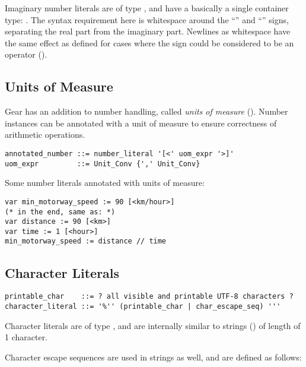 Imaginary number literals are of type , and have a basically a single container type: . The syntax requirement here is whitespace around the ``\code{+}'' and ``\code{+}'' signs, separating the real part from the imaginary part. Newlines as whitespace have the same effect as defined for cases where the sign could be considered to be an operator ().





\subsection{Units of Measure}
\label{sec:unitsofmeasuresyntax}

Gear has an addition to number handling, called {\em units of measure} (). Number instances can be annotated with a unit of measure to ensure correctness of arithmetic operations. 

\syntax\begin{lstlisting}
annotated_number ::= number_literal '[<' uom_expr '>]'
uom_expr         ::= Unit_Conv {',' Unit_Conv}
\end{lstlisting}

\example Some number literals annotated with units of measure:
\begin{lstlisting}
var min_motorway_speed := 90 [<km/hour>]
(* in the end, same as: *)
var distance := 90 [<km>]
var time := 1 [<hour>]
min_motorway_speed := distance // time
\end{lstlisting}






\subsection{Character Literals}
\label{sec:characterliterals}

\syntax\begin{lstlisting}
printable_char    ::= ? all visible and printable UTF-8 characters ? 
character_literal ::= '%'' (printable_char | char_escape_seq) '''
\end{lstlisting}

Character literals are of type , and are internally similar to strings () of length of 1 character. 

Character escape sequences are used in strings as well, and are defined as follows: 

